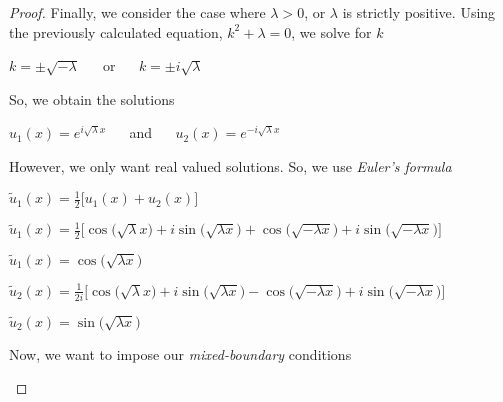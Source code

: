 \documentclass[executivepaper]{article}
\begin{document}
\begin{flushleft}
\begin{proof}
\vspace{5mm}

Finally, we consider the case where $\lambda > 0$, or $\lambda$ is strictly positive. Using the previously calculated equation, $k^2+\lambda=0$, we solve for $k$

\begin{center}

$k=\pm \sqrt{-\lambda}$ $\quad$ or $\quad$ $k=\pm i\sqrt{\lambda}$

\end{center}

So, we obtain the solutions

\begin{center}

$u_{1}(x)=e^{i\sqrt{\lambda} x}$ $\quad$ and $\quad$ $u_{2}(x)=e^{-i\sqrt{\lambda} x}$

\end{center}

However, we only want real valued solutions. So, we use \textit{Euler's formula}

\begin{center}

$\tilde{u}_{1}(x)=\frac{1}{2} \bigg[u_{1}(x) + u_{2}(x)\bigg]$

\vspace{2mm}

$\tilde{u}_{1}(x)=\frac{1}{2} \bigg[\cos\bigg(\sqrt{\lambda} x\bigg) + i\sin\bigg(\sqrt{\lambda x}\bigg) + \cos\bigg(\sqrt{-\lambda x}\bigg) + i\sin\bigg(\sqrt{-\lambda x}\bigg)\bigg]$

\vspace{2mm}

$\tilde{u}_{1}(x)=\cos\bigg(\sqrt{\lambda x}\bigg)$

\vspace{2mm}

$\tilde{u}_{2}(x)=\frac{1}{2i} \bigg[\cos\bigg(\sqrt{\lambda} x\bigg) + i\sin\bigg(\sqrt{\lambda x}\bigg) - \cos\bigg(\sqrt{-\lambda x}\bigg) + i\sin\bigg(\sqrt{-\lambda x}\bigg)\bigg]$

\vspace{2mm}

$\tilde{u}_{2}(x)=\sin\bigg(\sqrt{\lambda x}\bigg)$

\end{center}

Now, we want to impose our \textit{mixed-boundary} conditions

\begin{center}


\end{center}
\end{proof}
\end{flushleft}
\end{document}
